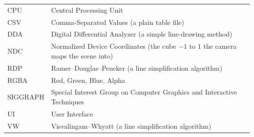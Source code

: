 \begin{tabular}{@{}p{2.6cm}l@{}}
CPU & Central Processing Unit\\
CSV & Comma-Separated Values (a plain table file)\\
DDA & Digital Differential Analyzer (a simple line-drawing method)\\
NDC & Normalized Device Coordinates (the cube $-1$ to $1$ the camera maps the scene into)\\
RDP & Ramer--Douglas--Peucker (a line simplification algorithm)\\
RGBA & Red, Green, Blue, Alpha\\
SIGGRAPH & Special Interest Group on Computer Graphics and Interactive Techniques\\
UI & User Interface\\
VW & Visvalingam--Whyatt (a line simplification algorithm)\\
\end{tabular}
